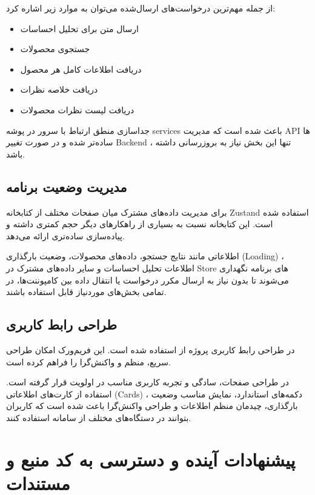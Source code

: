 از جمله مهم‌ترین درخواست‌های ارسال‌شده می‌توان به موارد زیر اشاره کرد:
\begin{itemize}
	\item ارسال متن برای تحلیل احساسات
	\item جستجوی محصولات
	\item دریافت اطلاعات کامل هر محصول
	\item دریافت خلاصه نظرات
	\item دریافت لیست نظرات محصولات
\end{itemize}
جداسازی منطق ارتباط با سرور در پوشه services باعث شده است که مدیریت API ها ساده‌تر شده و در صورت تغییر Backend ، تنها این بخش نیاز به بروزرسانی داشته باشد.
\subsection{مدیریت وضعیت برنامه }
برای مدیریت داده‌های مشترک میان صفحات مختلف از کتابخانه Zustand استفاده شده است. این کتابخانه نسبت به بسیاری از راهکارهای دیگر حجم کمتری داشته و پیاده‌سازی ساده‌تری ارائه می‌دهد.

اطلاعاتی مانند نتایج جستجو، داده‌های محصولات، وضعیت بارگذاری (Loading) ، اطلاعات تحلیل احساسات و سایر داده‌های مشترک در Store های برنامه نگهداری می‌شوند تا بدون نیاز به ارسال مکرر درخواست یا انتقال داده بین کامپوننت‌ها، در تمامی بخش‌های موردنیاز قابل استفاده باشند.
\subsection{طراحی رابط کاربری}
در طراحی رابط کاربری پروژه از  استفاده شده است. این فریم‌ورک امکان طراحی سریع، منظم و واکنش‌گرا را فراهم کرده است.

در طراحی صفحات، سادگی و تجربه کاربری مناسب در اولویت قرار گرفته است. استفاده از کارت‌های اطلاعاتی (Cards) ، دکمه‌های استاندارد، نمایش مناسب وضعیت بارگذاری، چیدمان منظم اطلاعات و طراحی واکنش‌گرا باعث شده است که کاربران بتوانند در دستگاه‌های مختلف از سامانه استفاده کنند.

\section{‌پیشنهادات آینده و دسترسی به کد منبع و مستندات}

